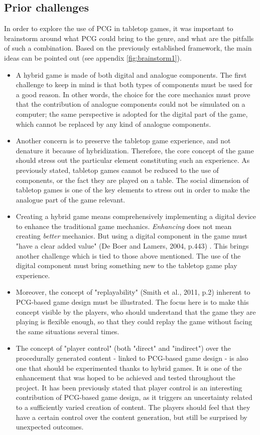 \subsection{Prior challenges}
In order to explore the use of PCG in tabletop games, it was important to brainstorm around what PCG could bring to the genre, and what are the pitfalls of such a combination. Based on the previously established framework, the main ideas can be pointed out (see appendix \ref{fig:brainstorm1}).
\begin{itemize}
\item A hybrid game is made of both digital and analogue components. The first challenge to keep in mind is that both types of components must be used for a good reason. In other words, the choice for the core mechanics must prove that the contribution of analogue components could not be simulated on a computer; the same perspective is adopted for the digital part of the game, which cannot be replaced by any kind of analogue components.  
\item Another concern is to preserve the tabletop game experience, and not denature it because of hybridization. Therefore, the core concept of the game should stress out the particular element constituting such an experience. As previously stated, tabletop games cannot be reduced to the use of components, or the fact they are played on a table. The social dimension of tabletop games is one of the key elements to stress out in order to make the analogue part of the game relevant.
\item Creating a hybrid game means comprehensively implementing a digital device to enhance the traditional game mechanics. \textit{Enhancing} does not mean creating \textit{better} mechanics. But using a digital component in the game must "have a clear added value" (De Boer and Lamers, 2004, p.443) \cite{chap:aug}. This brings another challenge which is tied to those above mentioned. The use of the digital component must bring something new to the tabletop game play experience.
\item Moreover, the concept of "replayability" (Smith et al., 2011, p.2) \cite{pdf:pcgbased} inherent to PCG-based game design must be illustrated. The focus here is to make this concept visible by the players, who should understand that the game they are playing is flexible enough, so that they could replay the game without facing the same situations several times.
\item The concept of "player control" (both "direct" and "indirect") \cite{pdf:pcgbased} over the procedurally generated content - linked to PCG-based game design - is also one that should be experimented thanks to hybrid games. It is one of the enhancement that was hoped to be achieved and tested throughout the project. It has been previously stated that player control is an interesting contribution of PCG-based game design, as it triggers an uncertainty related to a sufficiently varied creation of content. The players should feel that they have a certain control over the content generation, but still be surprised by unexpected outcomes.

\end{itemize}
